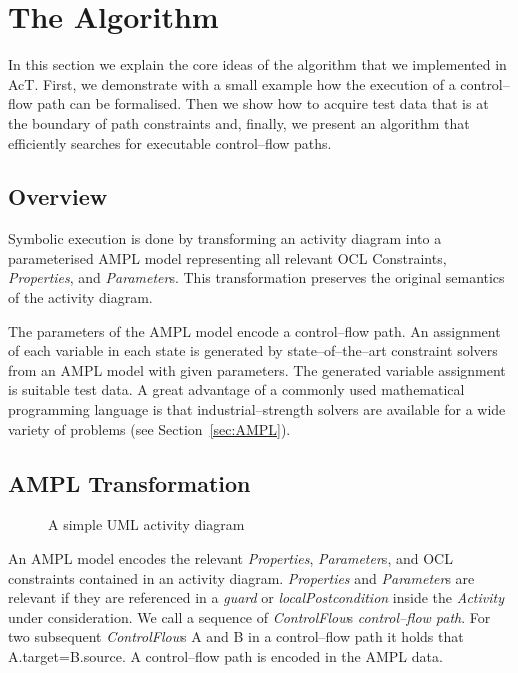 \documentclass[runningheads,a4paper]{llncs}%
\newcommand{\UMLType}[1]{\textsf{\textit{#1}}} %
\newcommand{\UMLReference}[1]{\textsf{\textit{#1}}} %
\begin{document}
\section{The Algorithm}%
\label{sec:Algorithm}%
In this section we explain the core ideas of the algorithm that we implemented
in AcT. First, we demonstrate with a
small example how the execution of a control--flow path can be formalised. Then
we show how to acquire test data that is at the boundary of path constraints
and, finally, we present an algorithm that efficiently searches for executable
control--flow paths.%
%
\subsection{Overview}%
Symbolic execution is done by transforming an activity diagram into a
parameterised AMPL model representing all relevant OCL Constraints,
\UMLType{Properties}, and \UMLType{Parameter}s. This transformation preserves
the original semantics of the activity diagram.

The parameters of the AMPL model encode a control--flow path. An assignment of
each variable in each state is generated by state--of--the--art constraint
solvers from an AMPL model with given parameters. The generated variable
assignment is suitable test data. A great advantage of a commonly used
mathematical programming language is that industrial--strength solvers are
available for a wide variety of problems (see Section~\ref{sec:AMPL}).
%
\subsection{AMPL Transformation}%
\label{sec:AMPLTransformation}%
\begin{figure}%
\def\svgwidth{\textwidth}%
\graphicspath{{./pics/}}%
%
\caption{A simple UML activity diagram}%
\label{fig:AssignmentDecision}%
\end{figure}%
An AMPL model encodes the relevant \UMLType{Properties}, \UMLType{Parameter}s,
and OCL constraints contained in an activity diagram. \UMLType{Properties} and
\UMLType{Parameter}s are relevant if they are referenced in a
\UMLReference{guard} or \UMLReference{localPostcondition} inside the
\UMLType{Activity} under consideration. We call a sequence of
\UMLReference{ControlFlow}s \emph{control--flow path}. For two subsequent
\UMLType{ControlFlow}s A and B in a control--flow path it holds that
A.target=B.source. A control--flow path is encoded in the AMPL data.
\end{document}
